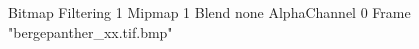 {Bitmap
	{Filtering 1}
	{Mipmap 1}
	{Blend none}
	{AlphaChannel 0}
	{Frame "bergepanther_xx.tif.bmp"}
}

